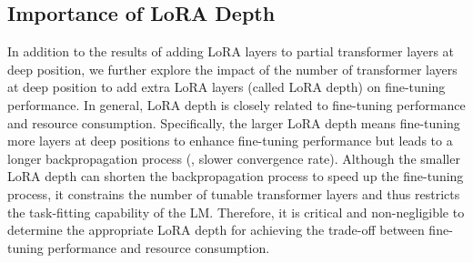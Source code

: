 
\subsection{Importance of LoRA Depth}
\label{lora-depth}
In addition to the results of adding LoRA layers to partial transformer layers at deep position, we further explore the impact of the number of transformer layers at deep position to add extra LoRA layers (called LoRA depth) on fine-tuning performance.
In general, LoRA depth is closely related to fine-tuning performance and resource consumption.
Specifically, the larger LoRA depth means fine-tuning more layers at deep positions to enhance fine-tuning performance but leads to a longer backpropagation process (\ie, slower convergence rate).
Although the smaller LoRA depth can shorten the backpropagation process to speed up the fine-tuning process, it constrains the number of tunable transformer layers and thus restricts the task-fitting capability of the LM.
Therefore, it is critical and non-negligible to determine the appropriate LoRA depth for achieving the trade-off between fine-tuning performance and resource consumption.


